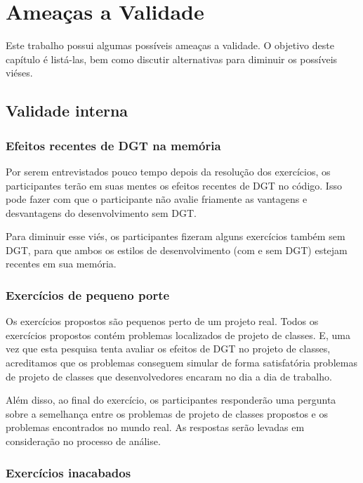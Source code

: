 \chapter{Ameaças a Validade}
\label{cap:ameacas}

Este trabalho possui algumas possíveis ameaças a validade. O objetivo
deste capítulo é listá-las, bem como discutir alternativas para diminuir
os possíveis viéses.

\section{Validade interna}

\subsection{Efeitos recentes de DGT na memória}

Por serem entrevistados pouco tempo depois da resolução dos exercícios, os participantes terão
em suas mentes os efeitos recentes de DGT no código. Isso pode fazer com que o participante
não avalie friamente as vantagens e desvantagens do desenvolvimento sem DGT. 

Para diminuir esse viés, os participantes fizeram alguns exercícios também
sem DGT, para que ambos os estilos de desenvolvimento (com e sem DGT) estejam
recentes em sua memória.

\subsection{Exercícios de pequeno porte}

Os exercícios propostos são pequenos perto de um projeto real. Todos os exercícios propostos contém
problemas localizados de projeto de classes. E, uma vez que esta pesquisa tenta avaliar os efeitos de DGT no projeto de classes, 
acreditamos que os problemas conseguem simular de forma satisfatória
problemas de projeto de classes que desenvolvedores encaram no dia a dia de trabalho.

Além disso, ao final do exercício, os participantes responderão uma pergunta sobre a semelhança
entre os problemas de projeto de classes propostos e os problemas encontrados no mundo real.
As respostas serão levadas em consideração no processo de análise.

\subsection{Exercícios inacabados}

